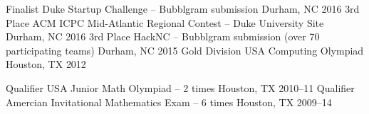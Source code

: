\begin{cvhonors}
  \cvhonor
    {Finalist}
    {Duke Startup Challenge -- Bubblgram submission}
    {Durham, NC}
    {2016}
  \cvhonor
    {3rd Place}
    {ACM ICPC Mid-Atlantic Regional Contest -- Duke University Site}
    {Durham, NC}
    {2016}
  \cvhonor
    {3rd Place}
    {HackNC -- Bubblgram submission (over 70 participating teams)}
    {Durham, NC}
    {2015}
  \cvhonor
    {Gold Division}
    {USA Computing Olympiad}
    {Houston, TX}
    {2012}
\end{cvhonors}

\begin{cvhonors}
  \cvhonor
    {Qualifier}
    {USA Junior Math Olympiad -- 2 times}
    {Houston, TX}
    {2010--11}
  \cvhonor
    {Qualifier}
    {Amercian Invitational Mathematics Exam -- 6 times}
    {Houston, TX}
    {2009--14}
\end{cvhonors}
